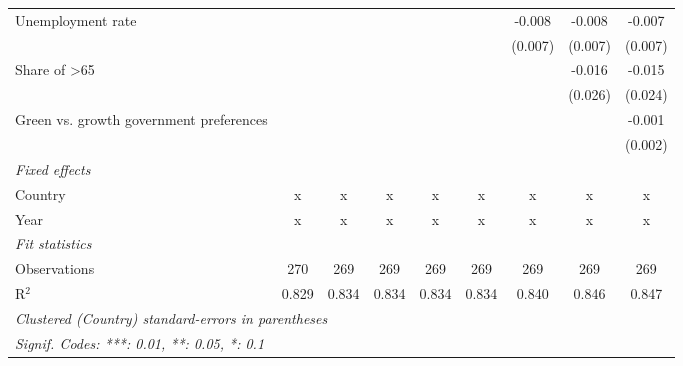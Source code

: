 \begin{table}[htbp]
\begin{tabular}{lcccccccc}
      Unemployment rate                                       &         &         &         &         &         & -0.008  & -0.008  & -0.007\\   
                                                              &         &         &         &         &         & (0.007) & (0.007) & (0.007)\\   
      Share of >65                                            &         &         &         &         &         &         & -0.016  & -0.015\\   
                                                              &         &         &         &         &         &         & (0.026) & (0.024)\\   
      Green vs. growth government preferences                 &         &         &         &         &         &         &         & -0.001\\   
                                                              &         &         &         &         &         &         &         & (0.002)\\   
      \emph{Fixed effects}\\
      Country                                                 & x       & x       & x       & x       & x       & x       & x       & x\\  
      Year                                                    & x       & x       & x       & x       & x       & x       & x       & x\\  
      \midrule \emph{Fit statistics}\\
      Observations                                            & 270     & 269     & 269     & 269     & 269     & 269     & 269     & 269\\  
      R$^2$                                                   & 0.829   & 0.834   & 0.834   & 0.834   & 0.834   & 0.840   & 0.846   & 0.847\\  
      \midrule
      \multicolumn{9}{l}{\emph{Clustered (Country) standard-errors in parentheses}}\\
      \multicolumn{9}{l}{\emph{Signif. Codes: ***: 0.01, **: 0.05, *: 0.1}}\\
   \end{tabular}
\end{table}


